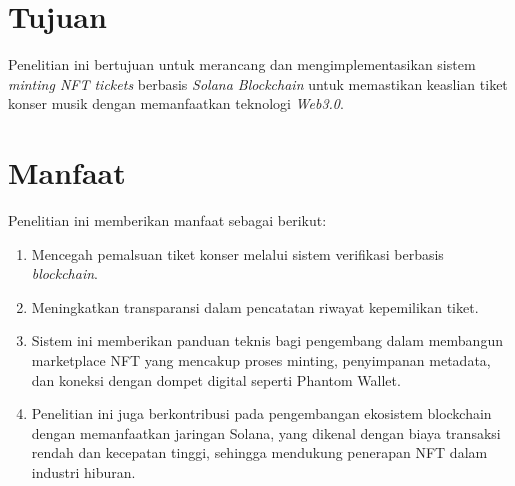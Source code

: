 \begin{enumerate}
\end{enumerate}



\section{Tujuan}

Penelitian ini bertujuan untuk merancang dan mengimplementasikan sistem \textit{minting NFT tickets} berbasis \textit{Solana Blockchain} untuk memastikan keaslian tiket konser musik dengan memanfaatkan teknologi \textit{Web3.0}.

\section{Manfaat}

Penelitian ini memberikan manfaat sebagai berikut:
\begin{enumerate}
    \item Mencegah pemalsuan tiket konser melalui sistem verifikasi berbasis \textit{blockchain}.
    \item Meningkatkan transparansi dalam pencatatan riwayat kepemilikan tiket.
    \item Sistem ini memberikan panduan teknis bagi pengembang dalam membangun marketplace NFT yang mencakup proses minting, penyimpanan metadata, dan koneksi dengan dompet digital seperti Phantom Wallet.
    \item Penelitian ini juga berkontribusi pada pengembangan ekosistem blockchain dengan memanfaatkan jaringan Solana, yang dikenal dengan biaya transaksi rendah dan kecepatan tinggi, sehingga mendukung penerapan NFT dalam industri hiburan.
\end{enumerate}
